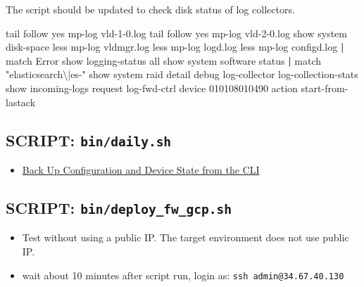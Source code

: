 \documentclass[
]{article}
\newenvironment{Shaded}{}{}
\newcommand{\ExtensionTok}[1]{#1}
\newcommand{\FunctionTok}[1]{\textcolor[rgb]{0.02,0.16,0.49}{#1}}
\newcommand{\KeywordTok}[1]{\textcolor[rgb]{0.00,0.44,0.13}{\textbf{#1}}}
\newcommand{\NormalTok}[1]{#1}
\newcommand{\StringTok}[1]{\textcolor[rgb]{0.25,0.44,0.63}{#1}}
\providecommand{\tightlist}{%
  \setlength{\itemsep}{0pt}\setlength{\parskip}{0pt}}
\begin{document}
The script should be updated to check disk status of log collectors.

\begin{Shaded}
\begin{Highlighting}[]
\FunctionTok{tail}\NormalTok{ follow yes  mp{-}log vld{-}1{-}0.log}
\FunctionTok{tail}\NormalTok{ follow yes  mp{-}log vld{-}2{-}0.log}
\ExtensionTok{show}\NormalTok{ system disk{-}space}
\FunctionTok{less}\NormalTok{ mp{-}log vldmgr.log}
\FunctionTok{less}\NormalTok{ mp{-}log logd.log}
\FunctionTok{less}\NormalTok{ mp{-}log configd.log }\KeywordTok{|} \ExtensionTok{match}\NormalTok{ Error}
\ExtensionTok{show}\NormalTok{ logging{-}status all}
\ExtensionTok{show}\NormalTok{ system software status }\KeywordTok{|} \ExtensionTok{match} \StringTok{"elasticsearch\textbackslash{}|es{-}"}
\ExtensionTok{show}\NormalTok{ system raid detail}
\ExtensionTok{debug}\NormalTok{ log{-}collector log{-}collection{-}stats show incoming{-}logs}
\ExtensionTok{request}\NormalTok{ log{-}fwd{-}ctrl device 010108010490 action start{-}from{-}lastack}
\end{Highlighting}
\end{Shaded}

\hypertarget{script-bindaily.sh}{%
\subsection{\texorpdfstring{SCRIPT:
\texttt{bin/daily.sh}}{SCRIPT: bin/daily.sh}}\label{script-bindaily.sh}}

\begin{itemize}
\tightlist
\item
  \href{https://knowledgebase.paloaltonetworks.com/KCSArticleDetail?id=kA10g000000ClJ9CAK}{Back
  Up Configuration and Device State from the CLI}
\end{itemize}

\hypertarget{script-bindeploy_fw_gcp.sh}{%
\subsection{\texorpdfstring{SCRIPT:
\texttt{bin/deploy\_fw\_gcp.sh}}{SCRIPT: bin/deploy\_fw\_gcp.sh}}\label{script-bindeploy_fw_gcp.sh}}

\begin{itemize}
\tightlist
\item
  Test without using a public IP. The target environment does not use
  public IP.
\item
  wait about 10 minutes after script run, login as:
  \texttt{ssh\ admin@34.67.40.130}
\end{itemize}
\end{document}
